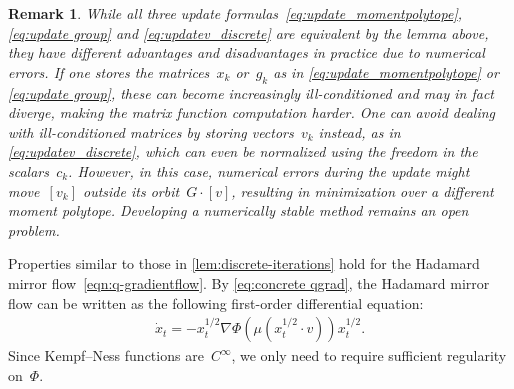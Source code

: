 \documentclass[11pt,letterpaper]{article}
\newtheorem{remark}[theorem]{Remark}\AddToHook{env/remark/begin}{\crefalias{theorem}{remark}}
\numberwithin{equation}{section}
\begin{document}
\begin{remark}\label{rem:numerical}
While all three update formulas~\eqref{eq:update_momentpolytope}, \eqref{eq:update group} and \eqref{eq:updatev_discrete} are equivalent by the lemma above, they have different advantages and disadvantages in practice due to numerical errors.
If one stores the matrices~$x_k$ or~$g_k$ as in \cref{eq:update_momentpolytope} or \cref{eq:update group}, these can become increasingly ill-conditioned and may in fact diverge, making the matrix function computation harder.
One can avoid dealing with ill-conditioned matrices by storing vectors~$v_k$ instead, as in \cref{eq:updatev_discrete}, which can even be normalized using the freedom in the scalars~$c_k$.
However, in this case, numerical errors during the update might move~$[v_k]$ outside its orbit~$G\cdot [v]$, resulting in minimization over a different moment polytope.
Developing a numerically stable method remains an open problem.
\end{remark}



Properties similar to those in \cref{lem:discrete-iterations} hold for the Hadamard mirror flow~\eqref{eqn:q-gradientflow}.
By \cref{eq:concrete qgrad}, the Hadamard mirror flow can be written as the following first-order differential equation:
\begin{align}\label{eq:flowupdate_momentpolytope}
    \dot x_t = -x_t^{1/2} \nabla \Phi(\mu(x_t^{1/2} \cdot v)) x_t^{1/2}.
\end{align}
Since Kempf--Ness functions are~$C^\infty$, we only need to require sufficient regularity on~$\Phi$.
\end{document}
